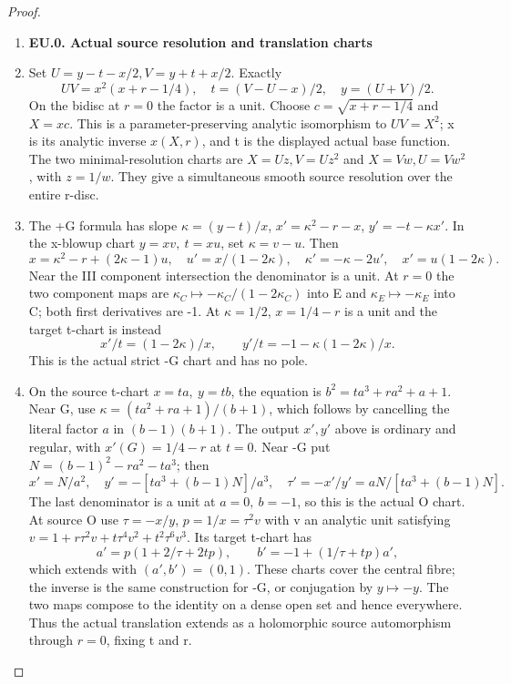 \begin{proof}
\begin{enumerate}[label=\arabic*.]
\item \par

\medskip\noindent\textbf{EU.0. Actual source resolution and translation charts}

\par\nobreak

\item Set \(U=y-t-x/2,V=y+t+x/2\). Exactly
\[
 UV=x^2(x+r-1/4),\quad t=(V-U-x)/2,\quad y=(U+V)/2.
\]
On the bidisc at \(r=0\) the factor is a unit. Choose
\(c=\sqrt{x+r-1/4}\) and \(X=xc\). This is a parameter-preserving
analytic isomorphism to \(UV=X^2\); x is its analytic inverse
\(x(X,r)\), and t is the displayed actual base function. The
two minimal-resolution charts are \(X=Uz,V=Uz^2\) and
\(X=Vw,U=Vw^2\), with \(z=1/w\). They give a simultaneous smooth
source resolution over the entire r-disc.

\item The +G formula has slope \(\kappa=(y-t)/x\),
\(x'=\kappa^2-r-x\), \(y'=-t-\kappa x'\).
In the x-blowup chart \(y=xv,\ t=xu\), set \(\kappa=v-u\). Then
\[
 x=\kappa^2-r+(2\kappa-1)u,\quad
 u'=x/(1-2\kappa),\quad \kappa'=-\kappa-2u',\quad
 x'=u(1-2\kappa).
\]
Near the III component intersection the denominator is a unit.
At \(r=0\) the two component maps are
\(\kappa_C\mapsto-\kappa_C/(1-2\kappa_C)\) into E and
\(\kappa_E\mapsto-\kappa_E\) into C; both first derivatives
are -1. At \(\kappa=1/2\), \(x=1/4-r\) is a unit and the target
t-chart is instead
\[
 x'/t=(1-2\kappa)/x,\qquad y'/t=-1-\kappa(1-2\kappa)/x.
\]
This is the actual strict -G chart and has no pole.

\item On the source t-chart \(x=ta,\ y=tb\), the equation is
\(b^2=ta^3+ra^2+a+1\). Near G, use
\(\kappa=(ta^2+ra+1)/(b+1)\), which follows by cancelling
the literal factor \(a\) in \((b-1)(b+1)\). The output \(x',y'\) above is
ordinary and regular, with \(x'(G)=1/4-r\) at \(t=0\). Near -G put
\(N=(b-1)^2-ra^2-ta^3\); then
\[
 x'=N/a^2,\quad y'=-[ta^3+(b-1)N]/a^3,
 \quad \tau'=-x'/y'=aN/[ta^3+(b-1)N].
\]
The last denominator is a unit at \(a=0,\ b=-1\), so this is the actual
O chart. At source O use \(\tau=-x/y\), \(p=1/x=\tau^2v\)
with v an analytic unit satisfying
\(v=1+r\tau^2v+t\tau^4v^2+t^2\tau^6v^3\). Its target
t-chart has
\[
 a'=p(1+2/\tau+2tp),\qquad
 b'=-1+(1/\tau+tp)a',
\]
which extends with \((a',b')=(0,1)\). These charts cover the central
fibre; the inverse is the same construction for -G, or conjugation
by \(y\mapsto-y\). The two maps compose to the identity on a dense open
set and hence everywhere. Thus the actual translation extends as
a holomorphic source automorphism through \(r=0\), fixing t and r.


\end{enumerate}
\end{proof}
